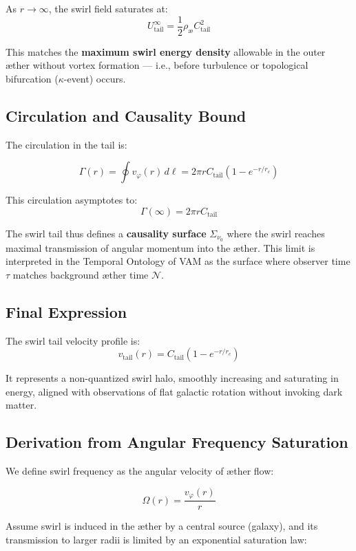 \documentclass[12pt]{article}
\begin{document}
As \( r \to \infty \), the swirl field saturates at:
\[
U_{\text{tail}}^\infty = \frac{1}{2} \rho_{\text{\ae}} C_{\text{tail}}^2
\]

This matches the \textbf{maximum swirl energy density} allowable in the outer æther without vortex formation — i.e., before turbulence or topological bifurcation (\( \kappa \)-event) occurs.

\subsection{Circulation and Causality Bound}

The circulation in the tail is:

\[
\Gamma(r) = \oint v_\varphi(r) \, d\ell = 2\pi r C_{\text{tail}} (1 - e^{-r/r_c})
\]

This circulation asymptotes to:
\[
\Gamma(\infty) = 2\pi r C_{\text{tail}}
\]

The swirl tail thus defines a \textbf{causality surface} \( \Sigma_{\nu_0} \) where the swirl reaches maximal transmission of angular momentum into the æther. This limit is interpreted in the Temporal Ontology of VAM as the surface where observer time \( \tau \) matches background æther time \( \mathcal{N} \).

\subsection{Final Expression}

The swirl tail velocity profile is:
\[
\boxed{
v_\text{tail}(r) = C_{\text{tail}} \left(1 - e^{-r/r_c} \right)
}
\]

It represents a non-quantized swirl halo, smoothly increasing and saturating in energy, aligned with observations of flat galactic rotation without invoking dark matter.

\subsection{Derivation from Angular Frequency Saturation}

We define swirl frequency as the angular velocity of æther flow:

\begin{equation}
    \Omega(r) = \frac{v_\varphi(r)}{r}
    \label{eq:omega_definition}
\end{equation}

Assume swirl is induced in the æther by a central source (galaxy), and its transmission to larger radii is limited by an exponential saturation law:
\end{document}
